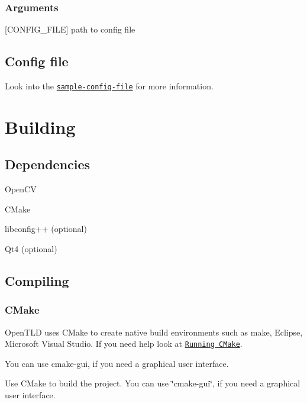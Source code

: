 \subsubsection*{Arguments}

{\ttfamily \mbox{[}C\-O\-N\-F\-I\-G\-\_\-\-F\-I\-L\-E\mbox{]}} path to config file

\subsection*{Config file}

Look into the \href{https://github.com/gnebehay/OpenTLD/blob/master/res/conf/config-sample.cfg}{\tt sample-\/config-\/file} for more information.

\section*{Building}

\subsection*{Dependencies}


\begin{DoxyItemize}
\item Open\-C\-V
\item C\-Make
\item libconfig++ (optional)
\item Qt4 (optional)
\end{DoxyItemize}

\subsection*{Compiling}

\subsubsection*{C\-Make}

Open\-T\-L\-D uses C\-Make to create native build environments such as make, Eclipse, Microsoft Visual Studio. If you need help look at \href{http://www.cmake.org/cmake/help/runningcmake.html}{\tt Running C\-Make}.

You can use {\ttfamily cmake-\/gui}, if you need a graphical user interface.

Use C\-Make to build the project. You can use \char`\"{}cmake-\/gui\char`\"{}, if you need a graphical user interface.

